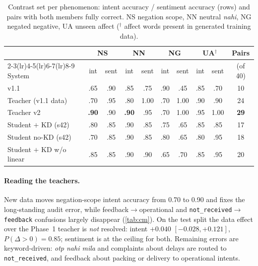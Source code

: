 \documentclass[11pt,a4paper]{article}
\theoremstyle{remark}
\newcommand{\lbl}[1]{\texttt{#1}}
\newcommand{\hi}[1]{\textit{#1}}
\begin{document}
\begin{table}[h]
\centering\small
\caption{Contrast set per phenomenon: intent accuracy / sentiment accuracy (rows) and pairs with both members fully correct. NS negation scope, NN neutral \hi{nahi}, NG negated negative, UA unseen affect ($^\dagger$ affect words present in generated training data).}
\label{tab:contrast}
\begin{tabular}{@{}l cc cc cc cc c@{}}
\toprule
& \multicolumn{2}{c}{NS} & \multicolumn{2}{c}{NN} & \multicolumn{2}{c}{NG} & \multicolumn{2}{c}{UA$^\dagger$} & Pairs \\
\cmidrule(lr){2-3}\cmidrule(lr){4-5}\cmidrule(lr){6-7}\cmidrule(lr){8-9}
System & int & sent & int & sent & int & sent & int & sent & (of 40) \\
\midrule
v1.1                 & .65 & .90 & .85 & .75 & .90 & .45 & .85 & .70 & 10 \\
Teacher (v1.1 data)  & .70 & .95 & .80 & 1.00 & .70 & 1.00 & .90 & .90 & 24 \\
Teacher v2           & \textbf{.90} & .90 & \textbf{.90} & .95 & .70 & 1.00 & .95 & 1.00 & \textbf{29} \\
Student $+$ KD (s42) & .80 & .85 & .90 & .85 & .75 & .65 & .85 & .85 & 17 \\
Student no-KD (s42)  & .70 & .85 & .90 & .85 & .80 & .65 & .80 & .95 & 18 \\
Student $+$ KD w/o linear & .85 & .85 & .90 & .90 & .65 & .70 & .85 & .95 & 20 \\
\bottomrule
\end{tabular}
\end{table}

\paragraph{Reading the teachers.} New data moves negation-scope intent accuracy from 0.70 to 0.90 and fixes the long-standing audit error, while feedback$\to$operational and \lbl{not\_received}$\to$\lbl{feedback} confusions largely disappear (\cref{tab:cm}). On the test split the data effect over the Phase~1 teacher is \emph{not} resolved: intent $+0.040$ $[-0.028, +0.121]$, $P(\Delta>0)=0.85$; sentiment is at the ceiling for both. Remaining errors are keyword-driven: \hi{otp nahi mila} and complaints about delays are routed to \lbl{not\_received}, and feedback about packing or delivery to operational intents.
\end{document}
